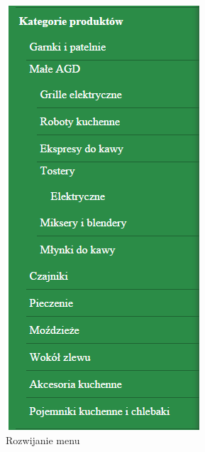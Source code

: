 \begin{figure}[H]
	\centering
	\includegraphics {fig/menu_rozwijanie}
	\caption{Rozwijanie menu}
	\label{fig:menu_rozwijalne}
\end{figure}